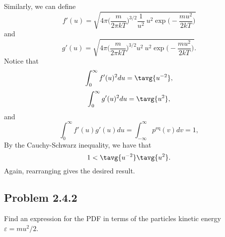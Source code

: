 Similarly, we can define 
\begin{equation}
f'(u) = \sqrt{4\pi \bigg( \frac{m}{2\pi k T}\bigg)^{3/2} \frac{1}{u^2}~u^2 \exp\bigg(-\frac{m u^2}{2 k T}\bigg) }
\end{equation}
and
\begin{equation}
g'(u) = \sqrt{4\pi \bigg( \frac{m}{2\pi k T}\bigg)^{3/2} u^2 ~u^2 \exp\bigg(-\frac{m u^2}{2 k T}\bigg) }.
\end{equation}
Notice that
\begin{equation}
\int_{0}^{\infty} f'(u)^2 du = \tavg{u^{-2}},
\end{equation}
\begin{equation}
\int_{0}^{\infty} g'(u)^2 du  = \tavg{u^2},
\end{equation}
and
\begin{equation}
\int_{0}^{\infty} f'(u)g'(u)du  = \int_{-\infty}^{\infty} p^{\text{eq}}(v) dv = 1,
\end{equation}
By the Cauchy-Schwarz inequality, we have that
\begin{equation}
1 < \tavg{u^{-2}} \tavg{u^2}.
\end{equation}
Again, rearranging gives the desired result.

\subsection{Problem 2.4.2}

Find an expression for the PDF in terms of the particles kinetic energy $\varepsilon = m u ^2 / 2$. 


